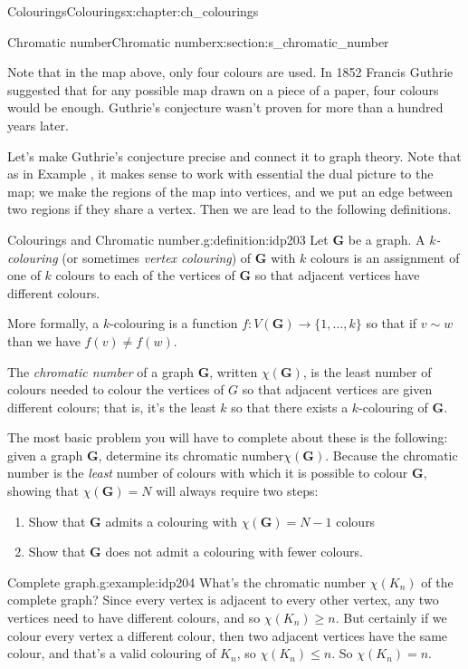\documentclass[oneside,10pt,]{book}
\numberwithin{equation}{section}
\newcommand{\bfG}{\mathbf{G}}
\begin{document}
\begin{chapterptx}{Colourings}{}{Colourings}{}{}{x:chapter:ch_colourings}
\begin{sectionptx}{Chromatic number}{}{Chromatic number}{}{}{x:section:s_chromatic_number}
\begin{figureptx}
\begin{image}{0.15}{0.7}{0.15}
\end{image}%
\tcblower
\end{figureptx}%
Note that in the map above, only four colours are used.  In 1852 Francis Guthrie suggested that for any possible map drawn on a piece of a paper, four colours would be enough.  Guthrie's conjecture wasn't proven for more than a hundred years later.%
\par
Let's make Guthrie's conjecture precise and connect it to graph theory.  Note that as in Example , it makes sense to work with essential the dual picture to the map; we make the regions of the map into vertices, and we put an edge between two regions if they share a vertex.  Then we are lead to the following definitions.%
\begin{definition}{Colourings and Chromatic number.}{g:definition:idp203}%
Let \(\bfG\) be a graph.  A \emph{\(k\)-colouring} (or sometimes \emph{vertex colouring}) of \(\bfG\) with \(k\) colours is an assignment of one of \(k\) colours to each of the vertices of \(\bfG\) so that adjacent vertices have different colours.%
\par
More formally, a \(k\)-colouring is a function \(f:V(\bfG)\to\{1,\dots,k\}\) so that if \(v\sim w\) than we have \(f(v)\neq f(w)\).%
\par
The \emph{chromatic number} of a graph \(\bfG\), written \(\chi(\bfG)\), is the least number of colours needed to colour the vertices of \(G\) so that adjacent vertices are given different colours; that is, it's the least \(k\) so that there exists a \(k\)-colouring of \(\bfG\).%
\end{definition}
The most basic problem you will have to complete about these is the following: given a graph \(\bfG\), determine its chromatic number\(\chi(\bfG)\).  Because the chromatic number is the \emph{least} number of colours with which it is possible to colour \(\bfG\), showing that \(\chi(\bfG)=N\) will always require two steps:%
%
\begin{enumerate}
\item{}Show that \(\bfG\) admits a colouring with \(\chi(\bfG)=N-1\) colours%
\item{}Show that \(\bfG\) does not admit a colouring with fewer colours.%
\end{enumerate}
\begin{example}{Complete graph.}{g:example:idp204}%
What's the chromatic number \(\chi(K_n)\) of the complete graph?  Since every vertex is adjacent to every other vertex, any two vertices need to have different colours, and so \(\chi(K_n)\geq n\).  But certainly if we colour every vertex a different colour, then two adjacent vertices have the same colour, and that's a valid colouring of \(K_n\), so \(\chi(K_n)\leq n\).   So \(\chi(K_n)=n\).%

\end{example}
\end{sectionptx}
\end{chapterptx}
\end{document}
